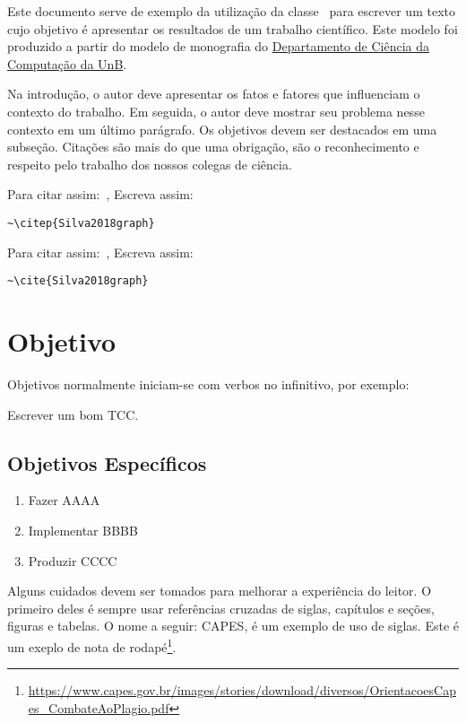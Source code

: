 
\label{Introducao}


Este documento serve de exemplo da utilização da classe \ifg\ para escrever um texto cujo objetivo é apresentar os resultados de um trabalho científico. 
Este modelo foi produzido a partir do modelo de monografia do \href{https://github.com/UnB-CIC/Monografia}{Departamento de Ciência da Computação da UnB}.

Na introdução, o autor deve apresentar os fatos e fatores que influenciam o contexto do trabalho.
Em seguida, o autor deve mostrar seu problema nesse contexto em um último parágrafo.
Os objetivos devem ser destacados em uma subseção.
Citações são mais do que uma obrigação, são o reconhecimento e respeito pelo trabalho dos nossos colegas de ciência.

Para citar assim:~\citep{Silva2018graph}, Escreva assim:

\begin{verbatim}
~\citep{Silva2018graph}
\end{verbatim}

Para citar assim:~\cite{Silva2018graph}, Escreva assim:

\begin{verbatim}
~\cite{Silva2018graph}
\end{verbatim}


\section*{Objetivo}

Objetivos normalmente iniciam-se com verbos no infinitivo, por exemplo: 

Escrever um bom TCC.

\subsection*{Objetivos Específicos}

\begin{enumerate}
	\item Fazer AAAA
	\item Implementar BBBB
	\item Produzir CCCC
\end{enumerate}

Alguns cuidados devem ser tomados para melhorar a experiência do leitor.
O primeiro deles é sempre usar referências cruzadas de siglas, capítulos e seções, figuras e tabelas.
O nome a seguir: \acrfull{CAPES}, é um exemplo de uso de siglas.
Este é um exeplo de nota de rodapé\footnote{\url{https://www.capes.gov.br/images/stories/download/diversos/OrientacoesCapes_CombateAoPlagio.pdf}}.

